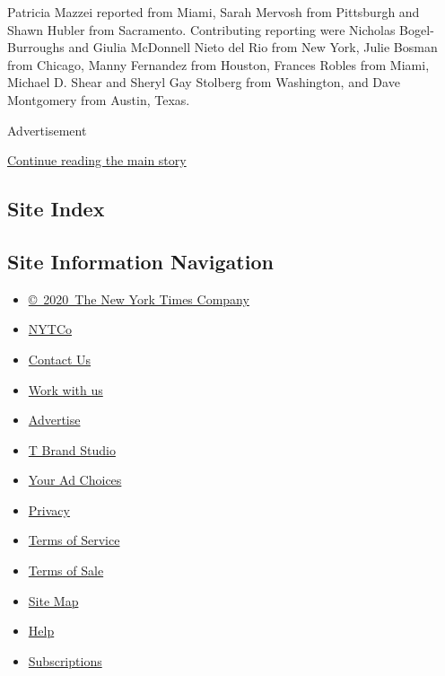 Patricia Mazzei reported from Miami, Sarah Mervosh from Pittsburgh and
Shawn Hubler from Sacramento. Contributing reporting were Nicholas
Bogel-Burroughs and Giulia McDonnell Nieto del Rio from New York, Julie
Bosman from Chicago, Manny Fernandez from Houston, Frances Robles from
Miami, Michael D. Shear and Sheryl Gay Stolberg from Washington, and
Dave Montgomery from Austin, Texas.

Advertisement

\protect\hyperlink{after-bottom}{Continue reading the main story}

\hypertarget{site-index}{%
\subsection{Site Index}\label{site-index}}

\hypertarget{site-information-navigation}{%
\subsection{Site Information
Navigation}\label{site-information-navigation}}

\begin{itemize}
\tightlist
\item
  \href{https://help.nytimes.com/hc/en-us/articles/115014792127-Copyright-notice}{©~2020~The
  New York Times Company}
\end{itemize}

\begin{itemize}
\tightlist
\item
  \href{https://www.nytco.com/}{NYTCo}
\item
  \href{https://help.nytimes.com/hc/en-us/articles/115015385887-Contact-Us}{Contact
  Us}
\item
  \href{https://www.nytco.com/careers/}{Work with us}
\item
  \href{https://nytmediakit.com/}{Advertise}
\item
  \href{http://www.tbrandstudio.com/}{T Brand Studio}
\item
  \href{https://www.nytimes.com/privacy/cookie-policy\#how-do-i-manage-trackers}{Your
  Ad Choices}
\item
  \href{https://www.nytimes.com/privacy}{Privacy}
\item
  \href{https://help.nytimes.com/hc/en-us/articles/115014893428-Terms-of-service}{Terms
  of Service}
\item
  \href{https://help.nytimes.com/hc/en-us/articles/115014893968-Terms-of-sale}{Terms
  of Sale}
\item
  \href{https://spiderbites.nytimes.com}{Site Map}
\item
  \href{https://help.nytimes.com/hc/en-us}{Help}
\item
  \href{https://www.nytimes.com/subscription?campaignId=37WXW}{Subscriptions}
\end{itemize}
